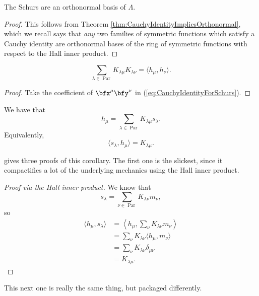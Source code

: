 \documentclass{article}
\DeclareMathOperator{\Par}{Par}
\begin{document}
\begin{corollary}
    The Schurs are an orthonormal basis of $\Lambda$.
\end{corollary}

\begin{proof}
    This follows from Theorem \ref{thm:CauchyIdentityImpliesOrthonormal}, which we recall says that \textit{any} two families of symmetric functions which satisfy a Cauchy identity are orthonormal bases of the ring of symmetric functions with respect to the Hall inner product.
\end{proof}

\begin{corollary}
    \[
        \sum_{\lambda \in \Par} K_{\lambda\mu}K_{\lambda\nu} = \langle h_\mu, h_\nu \rangle.
    \]
\end{corollary}

\begin{proof}
    Take the coefficient of $\bfx^\mu \bfy^\nu$ in (\ref{eq:CauchyIdentityForSchurs}).
\end{proof}

\begin{corollary}\label{thm:HToSIsKostka}
    We have that
    \[
        h_\mu = \sum_{\lambda \in \Par} K_{\lambda\mu}s_\lambda.
    \]
    Equivalently,
    \[
        \langle s_\lambda, h_\mu \rangle = K_{\lambda\mu}.
    \]
\end{corollary}

\cite{Stanley} gives three proofs of this corollary. The first one is the slickest, since it compactifies a lot of the underlying mechanics using the Hall inner product.

\begin{proof}[Proof via the Hall inner product]
    We know that
    \[
        s_\lambda = \sum_{\nu\in\Par} K_{\lambda\nu} m_\nu,
    \]
    so 
    \begin{align*}
        \langle h_\mu, s_\lambda \rangle &= \left\langle h_\mu, \sum_\nu K_{\lambda\nu} m_\nu \right\rangle \\
                                         &=\sum_{\nu} K_{\lambda\nu} \langle h_\mu, m_\nu \rangle \\
                                         &=\sum_{\nu} K_{\lambda\nu} \delta_{\mu\nu} \\
                                         &= K_{\lambda\mu}.
    \end{align*}
\end{proof}

This next one is really the same thing, but packaged differently.
\end{document}
